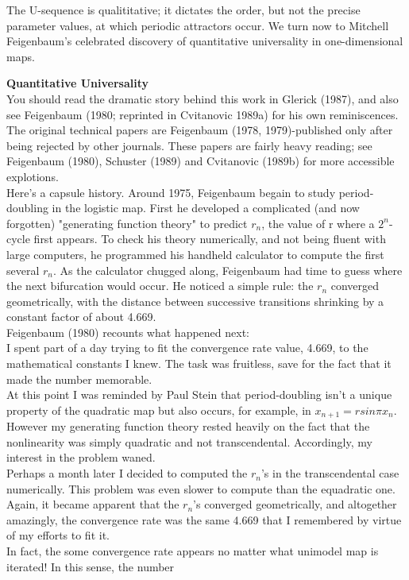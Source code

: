\documentclass{article}
\newcommand\tab[1][1cm]{\hspace*{#1}}
\begin{document}
The U-sequence is qualititative; it dictates the order, but not the precise parameter values, at which periodic attractors occur. We turn now to Mitchell Feigenbaum's celebrated discovery of quantitative universality in one-dimensional maps. 

\textbf {Quantitative Universality} \\ \tab
You should read the dramatic story behind this work in Glerick (1987), and also see Feigenbaum (1980; reprinted in Cvitanovic 1989a) for his own reminiscences. The original technical papers are Feigenbaum (1978, 1979)-published only after being rejected by other journals. These papers are fairly heavy reading; see Feigenbaum (1980), Schuster (1989) and Cvitanovic (1989b) for more accessible explotions. \\ \tab
Here's a capsule history. Around 1975, Feigenbaum begain to study period-doubling in the logistic map. First he developed a complicated (and now forgotten) "generating function theory" to predict $r_{n}$, the value of r where a $2^{n}$-cycle first appears. To check his theory numerically, and not being fluent with large computers, he programmed his handheld calculator to compute the first several $r_{n}$. As the calculator chugged along, Feigenbaum had time to guess where the next bifurcation would occur. He noticed a simple rule: the $r_{n}$ converged geometrically, with the distance between successive transitions shrinking by a constant factor of about 4.669. \\ \tab
Feigenbaum (1980) recounts what happened next: \\ \tab \tab
I spent part of a day trying to fit the convergence rate value, 4.669, to the mathematical constants I knew. The task was fruitless, save for the fact that it made the number memorable. \\ \tab \tab
At this point I was reminded by Paul Stein that period-doubling isn't a unique property of the quadratic map but also occurs, for example, in $x_{n+1}=rsin \pi x_{n}$. However my generating function theory rested heavily on the fact that the nonlinearity was simply quadratic and not transcendental. Accordingly, my interest in the problem waned. \\ \tab \tab
Perhaps a month later I decided to computed the $r_{n}$'s in the transcendental case numerically. This problem was even slower to compute than the equadratic one. Again, it became apparent that the $r_{n}$'s converged geometrically, and altogether amazingly, the convergence rate was the same 4.669 that I remembered by virtue of my efforts to fit it. \\ \tab \tab
In fact, the some convergence rate appears no matter what unimodel map is iterated! In this sense, the number \\ \tab \tab
\end{document}
